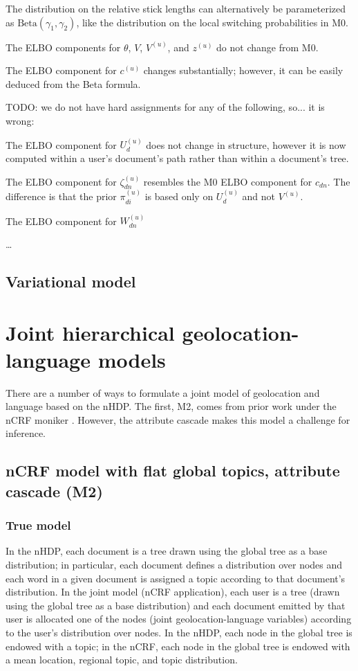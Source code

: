 \documentclass{article}
\newcommand{\Beta}{\ensuremath{\mathrm{Beta}}}
\begin{document}
The distribution on the relative stick lengths can alternatively be parameterized as $\Beta(\gamma_1, \gamma_2)$, like the distribution on the local switching probabilities in M0.

The ELBO components for $\theta$, $V$, $V^{(u)}$, and $z^{(u)}$ do not change from M0.

The ELBO component for $c^{(u)}$ changes substantially; however, it can be easily deduced from the Beta formula.

TODO: we do not have hard assignments for any of the following, so... it is wrong:

The ELBO component for $U^{(u)}_d$ does not change in structure, however it is now computed within a user's document's path rather than within a document's tree.

The ELBO component for $\zeta^{(u)}_{dn}$ resembles the M0 ELBO component for $c_{dn}$.  The difference is that the prior $\pi^{(u)}_{di}$ is based only on $U^{(u)}_d$ and not $V^{(u)}$.

The ELBO component for $W^{(u)}_{dn}$

\ldots


\subsection*{Variational model}



\section*{Joint hierarchical geolocation-language models}

There are a number of ways to formulate a joint model of geolocation and language based on the nHDP.  The first, M2, comes from prior work under the nCRF moniker \cite{ahmed2013,ahmed2013a}.  However, the attribute cascade makes this model a challenge for inference.

\subsection*{nCRF model with flat global topics, attribute cascade (M2)}

\subsubsection*{True model}

In the nHDP, each document is a tree drawn using the global tree as a base distribution; in particular, each document defines a distribution over nodes and each word in a given document is assigned a topic according to that document's distribution.  In the joint model (nCRF application), each user is a tree (drawn using the global tree as a base distribution) and each document emitted by that user is allocated one of the nodes (joint geolocation-language variables) according to the user's distribution over nodes.  In the nHDP, each node in the global tree is endowed with a topic; in the nCRF, each node in the global tree is endowed with a mean location, regional topic, and topic distribution.
\end{document}
